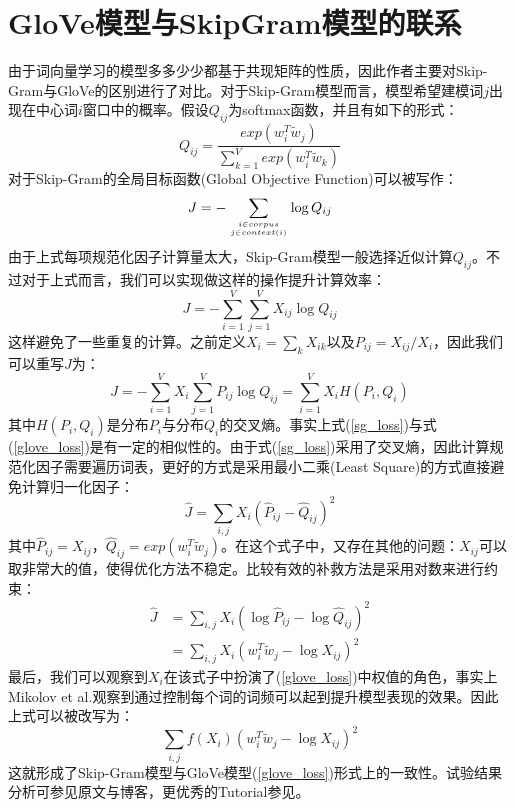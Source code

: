 \documentclass[UTF8, 12pt]{ctexart}
\begin{document}
	\section{GloVe模型与SkipGram模型的联系}
	由于词向量学习的模型多多少少都基于共现矩阵的性质，因此作者主要对Skip-Gram与GloVe的区别进行了对比。对于Skip-Gram模型而言，模型希望建模词$j$出现在中心词$i$窗口中的概率。假设$Q_{ij}$为softmax函数，并且有如下的形式：
	\begin{equation}
		Q_{ij}  = \frac{exp(w_{i}^{T}\tilde{w}_{j})}{\sum_{k=1}^{V}exp(w_{i}^{T}\tilde{w}_{k})}
	\end{equation}
	对于Skip-Gram的全局目标函数(Global Objective Function)可以被写作：
	\begin{equation}
		J = - \sum_{i \in corpus \atop j \in context(i)} \log Q_{ij}
	\end{equation}
	由于上式每项规范化因子计算量太大，Skip-Gram模型一般选择近似计算$Q_{ij}$。不过对于上式而言，我们可以实现做这样的操作提升计算效率：
	\begin{equation}
		J = -\sum_{i=1}^{V}\sum_{j=1}^{V}X_{ij}\log Q_{ij}
	\end{equation}
	这样避免了一些重复的计算。之前定义$X_{i} = \sum_{k}X_{ik}$以及$P_{ij} = X_{ij} / X_{i}$，因此我们可以重写$J$为：
	\begin{equation}
		J = - \sum_{i=1}^{V}X_{i}\sum_{j=1}^{V}P_{ij}\log Q_{ij}=\sum_{i=1}^{V}X_{i}H(P_{i}, Q_{i})
		\label{sg_loss}
	\end{equation}
	其中$H(P_{i}, Q_{i})$是分布$P_{i}$与分布$Q_{i}$的交叉熵。事实上式(\ref{sg_loss})与式(\ref{glove_loss})是有一定的相似性的。由于式(\ref{sg_loss})采用了交叉熵，因此计算规范化因子需要遍历词表，更好的方式是采用最小二乘(Least Square)的方式直接避免计算归一化因子：
	\begin{equation}
		\hat{J}= \sum_{i,j}X_{i}(\hat{P}_{ij} - \hat{Q}_{ij})^{2}
	\end{equation}
	其中$\hat{P}_{ij} = X_{ij}$，$\hat{Q}_{ij} = exp(w_{i}^{T}\tilde{w}_{j})$。在这个式子中，又存在其他的问题：$X_{ij}$可以取非常大的值，使得优化方法不稳定。比较有效的补救方法是采用对数来进行约束：
	\begin{align}
		\hat{J} & = \sum_{i,j}X_{i}(\log \hat{P}_{ij} - \log \hat{Q}_{ij})^{2} \\
				& = \sum_{i,j}X_{i}(w_{i}^{T}\tilde{w}_{j} - \log X_{ij})^{2}
	\end{align}
	最后，我们可以观察到$X_{i}$在该式子中扮演了(\ref{glove_loss})中权值的角色，事实上Mikolov et al.\cite{mikolov2013distributed}观察到通过控制每个词的词频可以起到提升模型表现的效果。因此上式可以被改写为：
	\begin{equation}
		\sum_{i,j}f(X_{i})(w_{i}^{T}\tilde{w}_{j} - \log X_{ij})^{2}
	\end{equation}
	这就形成了Skip-Gram模型与GloVe模型(\ref{glove_loss})形式上的一致性。试验结果分析可参见原文\cite{pennington2014glove}与博客\cite{范永勇}，更优秀的Tutorial参见\cite{hans}。

	
	
\end{document}
